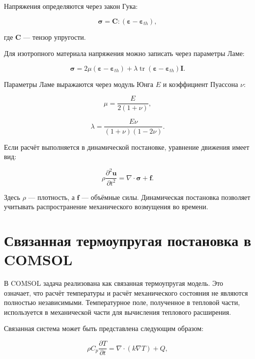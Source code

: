 Напряжения определяются через закон Гука:

\begin{equation}
\boldsymbol{\sigma}=\mathbf{C}:\left(\boldsymbol{\varepsilon}-\boldsymbol{\varepsilon}_{th}\right),
\end{equation}

где $\mathbf{C}$ --- тензор упругости.

Для изотропного материала напряжения можно записать через параметры Ламе:

\begin{equation}
\boldsymbol{\sigma}=2\mu(\boldsymbol{\varepsilon}-\boldsymbol{\varepsilon}_{th})+\lambda\operatorname{tr}(\boldsymbol{\varepsilon}-\boldsymbol{\varepsilon}_{th})\mathbf{I}.
\end{equation}

Параметры Ламе выражаются через модуль Юнга $E$ и коэффициент Пуассона $\nu$:

\begin{equation}
\mu=\frac{E}{2(1+\nu)},
\end{equation}

\begin{equation}
\lambda=\frac{E\nu}{(1+\nu)(1-2\nu)}.
\end{equation}

Если расчёт выполняется в динамической постановке, уравнение движения имеет вид:

\begin{equation}
\rho\frac{\partial^2\mathbf{u}}{\partial t^2}=\nabla\cdot\boldsymbol{\sigma}+\mathbf{f}.
\end{equation}

Здесь $\rho$ --- плотность, а $\mathbf{f}$ --- объёмные силы. Динамическая постановка позволяет учитывать распространение механического возмущения во времени.

\section{Связанная термоупругая постановка в COMSOL}

В COMSOL задача реализована как связанная термоупругая модель. Это означает, что расчёт температуры и расчёт механического состояния не являются полностью независимыми. Температурное поле, полученное в тепловой части, используется в механической части для вычисления теплового расширения.

Связанная система может быть представлена следующим образом:

\begin{equation}
\rho C_p\frac{\partial T}{\partial t}=\nabla\cdot(k\nabla T)+Q,
\end{equation}


